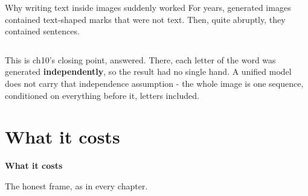 \documentclass[aspectratio=169]{beamer}
\begin{document}
\begin{frame}{Why writing text inside images suddenly worked}
  \small
  For years, generated images contained text-shaped marks that were not text. Then, quite
  abruptly, they contained sentences.
  \vskip 8pt
  \begin{columns}[T]
  \end{columns}
  \vskip 8pt
  \footnotesize
  \centering
  This is ch10's closing point, answered. There, each letter of the word was generated
  \textbf{independently}, so the result had no single hand. A unified model does not carry
  that independence assumption - the whole image is one sequence, conditioned on everything
  before it, letters included.
\end{frame}

\section{What it costs}

\begin{frame}[plain]
  \vfill
  \begin{center}
    {\Large\color{popblue}\textbf{What it costs}}\\[0.9em]
    \begin{minipage}{0.82\textwidth}\centering\small
      The honest frame, as in every chapter.
    \end{minipage}
  \end{center}
  \vfill
\end{frame}
\end{document}
